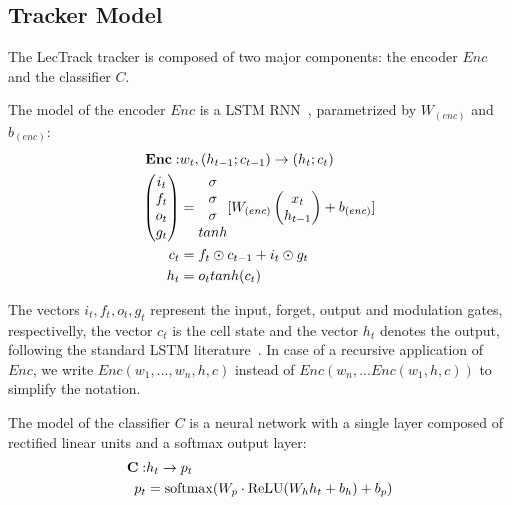 \documentclass[11pt,twocolumn]{article}
\begin{document}
\subsection{Tracker Model}
The LecTrack tracker is composed of two major components: the encoder $Enc$ and the classifier $C$.

The model of the encoder $Enc$ is a LSTM RNN~\cite{hochreiter1997long,zaremba2014recurrent}, parametrized by $W_{(enc)}$ and $b_{(enc)}$:
\begin{align*}
\bf{Enc}: & w_t, (h_{t-1}; c_{t-1}) \rightarrow  (h_t; c_t) \\
\begin{pmatrix}
i_t \\
f_t \\
o_t \\
g_t
\end{pmatrix} &=
\begin{matrix}
\sigma \\
\sigma \\
\sigma \\
tanh
\end{matrix}
[
W_{(enc)}
\begin{pmatrix}
x_t \\
h_{t-1}
\end{pmatrix}
+
b_{(enc)}
] \\
c_t &= f_t \odot c_{t-1} + i_t \odot g_t \\
h_t &= o_t tanh(c_t)
\end{align*}

The vectors $i_t, f_t, o_t, g_t$ represent the input, forget, output and modulation gates, respectivelly, the vector $c_t$ is the cell state and the vector $h_t$ denotes the output, following the standard LSTM literature~\cite{hochreiter1997long,zaremba2014recurrent}.
In case of a recursive application of $Enc$, we write $Enc(w_1, ..., w_n, h, c)$ instead of $Enc(w_n, ... Enc(w_1, h, c))$ to simplify the notation.

The model of the classifier $C$ is a neural network with a single layer composed of rectified linear units and a softmax output layer:
\begin{align*}
\bf{C}: & h_t \rightarrow p_t \\
p_t &= \operatorname{softmax}(W_p \cdot \operatorname{ReLU}(W_h h_t + b_h) + b_p) \\
\end{align*}
\end{document}
